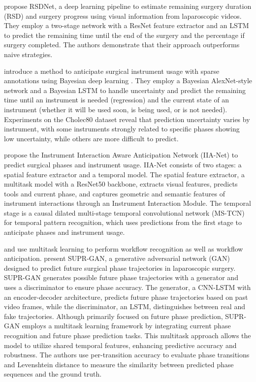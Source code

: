 \documentclass[times,twocolumn,final]{elsarticle}
\renewcommand{\cite}[1]{\citep{#1}}
\begin{document}
\citet{twinanda2018rsdnet} propose RSDNet, a deep learning pipeline to estimate remaining surgery duration (RSD) and surgery progress using visual information from laparoscopic videos. They employ a two-stage network with a ResNet feature extractor and an LSTM to predict the remaining time until the end of the surgery and the percentage if surgery completed. The authors demonstrate that their approach outperforms naive strategies.




\citet{rivoir2020rethinking} introduce a method to anticipate surgical instrument usage with sparse annotations using Bayesian deep learning \cite{NIPS2017_2650d608}. They employ a Bayesian AlexNet-style network \cite{alexnet} and a Bayesian LSTM \cite{LSTM} to handle uncertainty and predict the remaining time until an instrument is needed (regression) and the current state of an instrument (whether it will be used soon, is being used, or is not needed). Experiments on the Cholec80 dataset \cite{EndoNet} reveal that prediction uncertainty varies by instrument, with some instruments strongly related to specific phases showing low uncertainty, while others are more difficult to predict.


\citet{yuan2022anticipation} propose the Instrument Interaction Aware Anticipation Network (IIA-Net) to predict surgical phases and instrument usage. IIA-Net consists of two stages: a spatial feature extractor and a temporal model. The spatial feature extractor, a multitask model with a ResNet50 backbone, extracts visual features, predicts tools and current phase, and captures geometric and semantic features of instrument interactions through an Instrument Interaction Module. The temporal stage is a causal dilated multi-stage temporal convolutional network (MS-TCN) for temporal pattern recognition, which uses predictions from the first stage to anticipate phases and instrument usage.

\citet{ban2022supr} and \citet{jin2022trans} use multitask learning to perform workflow recognition as well as workflow anticipation.\citet{ban2022supr} present SUPR-GAN, a generative adversarial network (GAN) designed to predict future surgical phase trajectories in laparoscopic surgery. SUPR-GAN generates possible future phase trajectories with a generator and uses a discriminator to ensure phase accuracy. The generator, a CNN-LSTM with an encoder-decoder architecture, predicts future phase trajectories based on past video frames, while the discriminator, an LSTM, distinguishes between real and fake trajectories.
Although primarily focused on future phase prediction, SUPR-GAN employs a multitask learning framework by integrating current phase recognition and future phase prediction tasks. This multitask approach allows the model to utilize shared temporal features, enhancing predictive accuracy and robustness. The authors use per-transition accuracy to evaluate phase transitions and Levenshtein distance \citep{levenshtein1966binary} to measure the similarity between predicted phase sequences and the ground truth.
\end{document}
